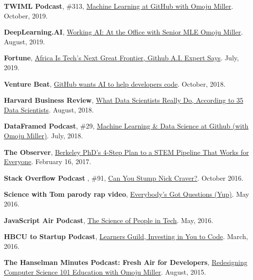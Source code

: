 \documentclass[11pt,article,oneside]{memoir}
\begin{document}
\ind \textbf{TWIML Podcast}, \#313,  \href{https://twimlai.com/podcast/twimlai/machine-learning-github-omoju-miller/}{Machine Learning at GitHub with Omoju Miller}. October, 2019.

\ind \textbf{DeepLearning.AI}, \href{https://www.deeplearning.ai/blog/working-ai-at-the-office-with-senior-mle-omoju-miller/}{Working AI: At the Office with Senior MLE Omoju Miller}. August, 2019.


\ind \textbf{Fortune}, \href{https://fortune.com/2019/07/17/africa-is-techs-next-great-frontier-github-ai/}{Africa Is Tech’s Next Great Frontier, Github A.I. Expert Says}. July, 2019.

\ind \textbf{Venture Beat}, \href{https://venturebeat.com/ai/github-wants-ai-to-help-developers-code/}{GitHub wants AI to help developers code}. October, 2018.

\ind \textbf{Harvard Business Review}, \href{https://hbr.org/2018/08/what-data-scientists-really-do-according-to-35-data-scientists}{What Data Scientists Really Do, According to 35 Data Scientists}. August, 2018.

\ind \textbf{DataFramed Podcast}, \#29, \href{https://www.datacamp.com/community/podcast/machine-learning-github}{Machine Learning \& Data Science at Github (with Omoju Miller)}. July, 2018.

\ind \textbf{The Observer}, \href{http://observer.com/2017/02/omoju-miller-etsy-stem-pipeline/}{Berkeley PhD's 4-Step Plan to a STEM Pipeline That Works for Everyone}. February 16, 2017.

\ind \textbf{Stack Overflow Podcast }, \#91, \href{https://soundcloud.com/stack-exchange/stack-overflow-podcast-91-can-you-stump-nick-craver}{Can You Stump Nick Craver?}. October 2016.

\ind \textbf{Science with Tom parody rap video}, \href{https://www.youtube.com/watch?v=q5mmE05e82I&ab_channel=ScienceWithTom}{Everybody's Got Questions (Yup)}. May 2016.

\ind \textbf{JavaScript Air Podcast}, \href{http://audio.javascriptair.com/e/022-jsair-the-science-of-people-in-tech-with-kate-edwards-omoju-miller-and-steve-andrews/}{The Science of People in Tech}. May, 2016.

\ind \textbf{HBCU to Startup Podcast}, \href{https://www.youtube.com/watch?v=T0wQRr4RuqM&ab_channel=HBCUtoStartup}{Learners Guild, Investing in You to Code}. March, 2016.

\ind \textbf{The Hanselman Minutes Podcast: Fresh Air for Developers}, \href{http://hanselminutes.com/488/redesigning-computer-science-101-education-with-omoju-miller}{Redesigning Computer Science 101 Education with Omoju Miller}. August, 2015.
\end{document}
